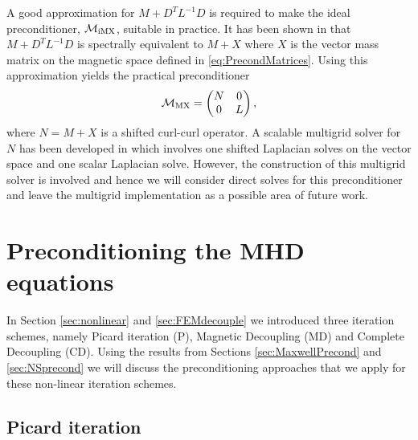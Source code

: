 A good approximation for $M+D^T L^{-1} D$ is required to make the ideal preconditioner, $\mathcal{M}_{\rm iMX}$, suitable in practice. It has been shown in \cite{greif2007preconditioners}  that $M+D^T L^{-1} D$ is spectrally equivalent to $M+X$  where $X$ is the vector mass matrix on the magnetic space defined in \eqref{eq:PrecondMatrices}. Using this approximation yields the practical preconditioner
\begin{equation}
\label{eq:maxwell_pc_X}
\mathcal{M}_{\rm MX} =
\begin{pmatrix}
N& 0 \\
0 & L
\end{pmatrix},
\end{equation}
where $N = M+X$ is a shifted curl-curl operator. A scalable multigrid solver for $N$ has been developed in \cite{hiptmair2007nodal} which involves one shifted Laplacian solves on the vector space and one scalar Laplacian solve. However, the construction of this multigrid solver is involved and hence we will consider direct solves for this preconditioner and leave the multigrid implementation as a possible area of future work.

\section{Preconditioning the MHD equations}
\label{sec:MHDp}
In Section \ref{sec:nonlinear} and \ref{sec:FEMdecouple} we introduced three iteration schemes, namely Picard iteration (P), Magnetic Decoupling (MD) and Complete Decoupling (CD). Using the results from Sections \ref{sec:MaxwellPrecond} and \ref{sec:NSprecond} we will discuss the preconditioning approaches that we apply for these non-linear iteration schemes.


\subsection{Picard iteration}
\label{sec:MHDprecond}



